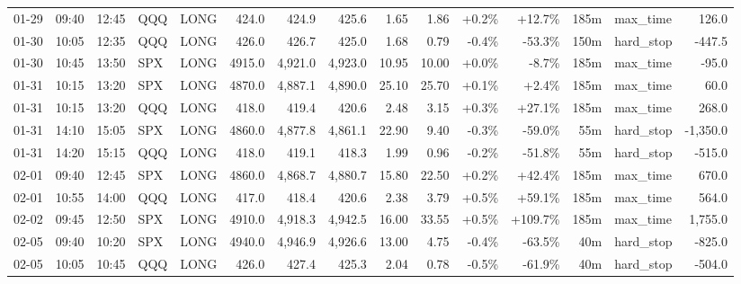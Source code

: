 \documentclass[11pt,a4paper,twoside]{article}
\begin{document}
\begin{landscape}
\begin{center}
\begin{longtable}{>{\color{txtmain}}l l l l l r r r r r r r r >{\color{txtmain}}l r}
01-29 & 09:40 & 12:45 & QQQ & LONG & 424.0 & 424.9 & 425.6 & 1.65 & 1.86 & \textcolor{wingreen}{+0.2\%} & \textcolor{wingreen}{+12.7\%} & 185m & max\_time & \textcolor{wingreen}{126.0} \\
01-30 & 10:05 & 12:35 & QQQ & LONG & 426.0 & 426.7 & 425.0 & 1.68 & 0.79 & \textcolor{lossred}{-0.4\%} & \textcolor{lossred}{-53.3\%} & 150m & hard\_stop & \textcolor{lossred}{-447.5} \\
01-30 & 10:45 & 13:50 & SPX & LONG & 4915.0 & 4,921.0 & 4,923.0 & 10.95 & 10.00 & \textcolor{wingreen}{+0.0\%} & \textcolor{lossred}{-8.7\%} & 185m & max\_time & \textcolor{lossred}{-95.0} \\
01-31 & 10:15 & 13:20 & SPX & LONG & 4870.0 & 4,887.1 & 4,890.0 & 25.10 & 25.70 & \textcolor{wingreen}{+0.1\%} & \textcolor{wingreen}{+2.4\%} & 185m & max\_time & \textcolor{wingreen}{60.0} \\
01-31 & 10:15 & 13:20 & QQQ & LONG & 418.0 & 419.4 & 420.6 & 2.48 & 3.15 & \textcolor{wingreen}{+0.3\%} & \textcolor{wingreen}{+27.1\%} & 185m & max\_time & \textcolor{wingreen}{268.0} \\
01-31 & 14:10 & 15:05 & SPX & LONG & 4860.0 & 4,877.8 & 4,861.1 & 22.90 & 9.40 & \textcolor{lossred}{-0.3\%} & \textcolor{lossred}{-59.0\%} & 55m & hard\_stop & \textcolor{lossred}{-1,350.0} \\
01-31 & 14:20 & 15:15 & QQQ & LONG & 418.0 & 419.1 & 418.3 & 1.99 & 0.96 & \textcolor{lossred}{-0.2\%} & \textcolor{lossred}{-51.8\%} & 55m & hard\_stop & \textcolor{lossred}{-515.0} \\
02-01 & 09:40 & 12:45 & SPX & LONG & 4860.0 & 4,868.7 & 4,880.7 & 15.80 & 22.50 & \textcolor{wingreen}{+0.2\%} & \textcolor{wingreen}{+42.4\%} & 185m & max\_time & \textcolor{wingreen}{670.0} \\
02-01 & 10:55 & 14:00 & QQQ & LONG & 417.0 & 418.4 & 420.6 & 2.38 & 3.79 & \textcolor{wingreen}{+0.5\%} & \textcolor{wingreen}{+59.1\%} & 185m & max\_time & \textcolor{wingreen}{564.0} \\
02-02 & 09:45 & 12:50 & SPX & LONG & 4910.0 & 4,918.3 & 4,942.5 & 16.00 & 33.55 & \textcolor{wingreen}{+0.5\%} & \textcolor{wingreen}{+109.7\%} & 185m & max\_time & \textcolor{wingreen}{1,755.0} \\
02-05 & 09:40 & 10:20 & SPX & LONG & 4940.0 & 4,946.9 & 4,926.6 & 13.00 & 4.75 & \textcolor{lossred}{-0.4\%} & \textcolor{lossred}{-63.5\%} & 40m & hard\_stop & \textcolor{lossred}{-825.0} \\
02-05 & 10:05 & 10:45 & QQQ & LONG & 426.0 & 427.4 & 425.3 & 2.04 & 0.78 & \textcolor{lossred}{-0.5\%} & \textcolor{lossred}{-61.9\%} & 40m & hard\_stop & \textcolor{lossred}{-504.0} \\

\end{longtable}
\end{center}
\end{landscape}
\end{document}
